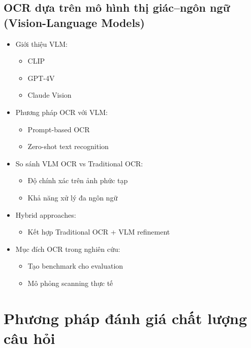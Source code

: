 \subsection{OCR dựa trên mô hình thị giác--ngôn ngữ (Vision-Language Models)}
\begin{itemize}
    \item Giới thiệu VLM:
    \begin{itemize}
        \item CLIP
        \item GPT-4V
        \item Claude Vision
    \end{itemize}
    \item Phương pháp OCR với VLM:
    \begin{itemize}
        \item Prompt-based OCR
        \item Zero-shot text recognition
    \end{itemize}
    \item So sánh VLM OCR vs Traditional OCR:
    \begin{itemize}
        \item Độ chính xác trên ảnh phức tạp
        \item Khả năng xử lý đa ngôn ngữ
    \end{itemize}
    \item Hybrid approaches:
    \begin{itemize}
        \item Kết hợp Traditional OCR + VLM refinement
    \end{itemize}
    \item Mục đích OCR trong nghiên cứu:
    \begin{itemize}
        \item Tạo benchmark cho evaluation
        \item Mô phỏng scanning thực tế
    \end{itemize}
\end{itemize}

\section{Phương pháp đánh giá chất lượng câu hỏi}

